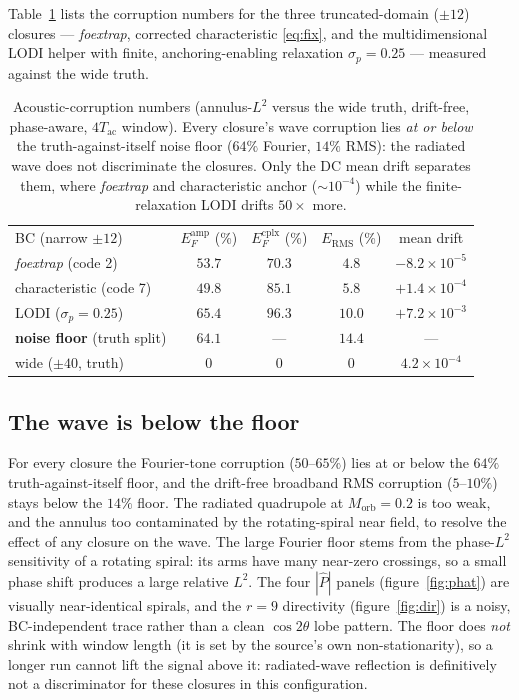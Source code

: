 \documentclass{jfm}
\begin{document}
Table~\ref{tab:cvp} lists the corruption numbers for the three truncated-domain ($\pm12$)
closures --- \textit{foextrap}, corrected characteristic \eqref{eq:fix}, and the
multidimensional LODI helper with finite, anchoring-enabling relaxation $\sigma_p=0.25$ ---
measured against the wide truth.

\begin{table}
  \centering
  \begin{tabular}{lcccc}
    BC (narrow $\pm12$) & $E_F^{\mathrm{amp}}$ (\%) & $E_F^{\mathrm{cplx}}$ (\%)
      & $E_{\mathrm{RMS}}$ (\%) & mean drift\\[3pt]
    \textit{foextrap} (code 2)       & $53.7$ & $70.3$ & $4.8$  & $-8.2\times10^{-5}$\\
    characteristic (code 7)          & $49.8$ & $85.1$ & $5.8$  & $+1.4\times10^{-4}$\\
    LODI ($\sigma_p{=}0.25$)         & $65.4$ & $96.3$ & $10.0$ & $+7.2\times10^{-3}$\\[3pt]
    \textbf{noise floor} (truth split)& $\mathbf{64.1}$ & --- & $\mathbf{14.4}$ & ---\\
    wide ($\pm40$, truth)            & $0$ & $0$ & $0$ & $4.2\times10^{-4}$\\
  \end{tabular}
  \caption{Acoustic-corruption numbers (annulus-$L^2$ versus the wide truth,
  drift-free, phase-aware, $4T_{\mathrm{ac}}$ window). Every closure's wave
  corruption lies \emph{at or below} the truth-against-itself noise floor
  ($64\%$ Fourier, $14\%$ RMS): the radiated wave does not discriminate the
  closures. Only the DC mean drift separates them, where \textit{foextrap} and
  characteristic anchor ($\sim10^{-4}$) while the finite-relaxation LODI drifts
  $50\times$ more.}
  \label{tab:cvp}
\end{table}

\subsection{The wave is below the floor}

For every closure the Fourier-tone corruption ($50$--$65\%$) lies at or below the $64\%$
truth-against-itself floor, and the drift-free broadband RMS corruption ($5$--$10\%$) stays
below the $14\%$ floor. The radiated quadrupole at $M_{\mathrm{orb}}=0.2$ is too weak, and
the annulus too contaminated by the rotating-spiral near field, to resolve the effect of
any closure on the wave. The large Fourier floor stems from the phase-$L^2$ sensitivity of
a rotating spiral: its arms have many near-zero crossings, so a small phase shift produces
a large relative $L^2$. The four $|\hat P|$ panels (figure~\ref{fig:phat}) are visually
near-identical spirals, and the $r=9$ directivity (figure~\ref{fig:dir}) is a noisy,
BC-independent trace rather than a clean $\cos2\theta$ lobe pattern. The floor does
\emph{not} shrink with window length (it is set by the source's own non-stationarity), so
a longer run cannot lift the signal above it: radiated-wave reflection is definitively not
a discriminator for these closures in this configuration.
\end{document}

